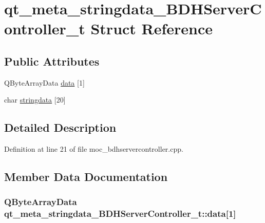 \hypertarget{structqt__meta__stringdata___b_d_h_server_controller__t}{}\section{qt\+\_\+meta\+\_\+stringdata\+\_\+\+B\+D\+H\+Server\+Controller\+\_\+t Struct Reference}
\label{structqt__meta__stringdata___b_d_h_server_controller__t}
\subsection*{Public Attributes}
\begin{DoxyCompactItemize}
\item 
Q\+Byte\+Array\+Data \hyperlink{structqt__meta__stringdata___b_d_h_server_controller__t_af9aa522ffe903871eb505aa9a3008ddf}{data} \mbox{[}1\mbox{]}
\item 
char \hyperlink{structqt__meta__stringdata___b_d_h_server_controller__t_aa38bafff78dcda3722599e50d7d6721a}{stringdata} \mbox{[}20\mbox{]}
\end{DoxyCompactItemize}


\subsection{Detailed Description}


Definition at line 21 of file moc\+\_\+bdhservercontroller.\+cpp.



\subsection{Member Data Documentation}
\hypertarget{structqt__meta__stringdata___b_d_h_server_controller__t_af9aa522ffe903871eb505aa9a3008ddf}{}
\subsubsection[{data}]{\setlength{\rightskip}{0pt plus 5cm}Q\+Byte\+Array\+Data qt\+\_\+meta\+\_\+stringdata\+\_\+\+B\+D\+H\+Server\+Controller\+\_\+t\+::data\mbox{[}1\mbox{]}}\label{structqt__meta__stringdata___b_d_h_server_controller__t_af9aa522ffe903871eb505aa9a3008ddf}



